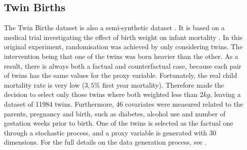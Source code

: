 \documentclass{report}
\newcommand{\bt}{\mathbf{t}}
\newcommand{\bx}{\mathbf{x}}
\begin{document}
\subsection{Twin Births}
The Twin Births dataset is also a semi-synthetic dataset \textcite{louizos2017causal}. It is based on a medical trial investigating the effect of birth weight on infant mortality \parencite{almond2005costs}. In this original experiment, randomisation was achieved by only considering twins. The intervention being that one of the twins was born heavier than the other. As a result, there is always both a factual and counterfactual case, because each pair of twins has the same values for the proxy variable. Fortunately, the real child mortality rate is very low ($3,5\%$ first year mortality). Therefore \textcite{louizos2017causal} made the decision to select only those twins where both weighted less than $2kg$, leaving a dataset of 11984 twins. Furthermore, 46 covariates were measured related to the parents, pregnancy and birth, such as diabetes, alcohol use and number of gestation weeks prior to birth. One of the twins is selected as the factual one through a stochastic process, and a proxy variable is generated with $30$ dimensions. For the full details on the data generation process, see \parencite{louizos2017causal}.

\end{document}
